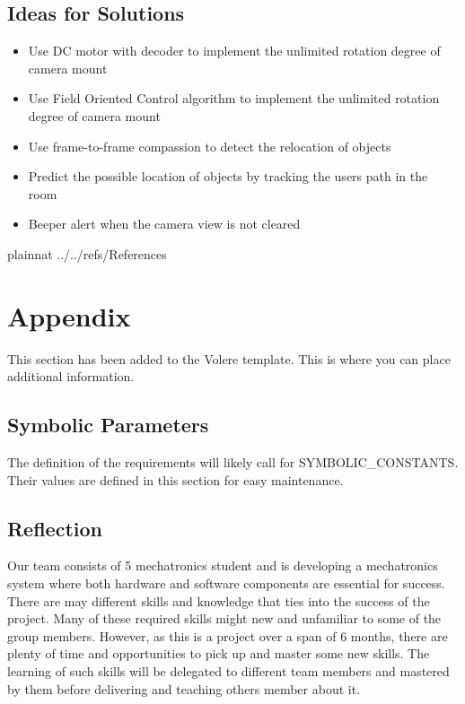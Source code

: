 \documentclass[12pt]{article}
\begin{document}
\subsection{Ideas for Solutions}
\begin{itemize}
    \item Use DC motor with decoder to implement the unlimited rotation degree of camera mount
    \item Use Field Oriented Control algorithm to implement the unlimited rotation degree of camera mount
    \item Use frame-to-frame compassion to detect the relocation of objects
    \item Predict the possible location of objects by tracking the users path in the room
    \item Beeper alert when the camera view is not cleared
\end{itemize}




\newpage

 {plainnat}
 {../../refs/References}

\newpage

\section{Appendix}

This section has been added to the Volere template.  This is where you can place
additional information.

\subsection{Symbolic Parameters}

The definition of the requirements will likely call for SYMBOLIC\_CONSTANTS.
Their values are defined in this section for easy maintenance.

\subsection{Reflection}

Our team consists of 5 mechatronics student and is developing a mechatronics system where both hardware and software components are essential for success. There are may different skills and knowledge that ties into the success of the project. Many of these required skills might new and unfamiliar to some of the group members. However, as this is a project over a span of 6 months, there are plenty of time and opportunities to pick up and master some new skills. The learning of such skills will be delegated to different team members and mastered by them before delivering and teaching others member about it.  
\end{document}
